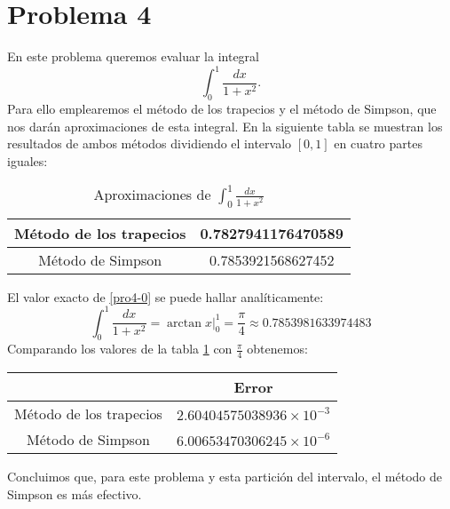 \documentclass[a4paper]{article}
\begin{document}
\section*{Problema 4}
En este problema queremos evaluar la integral 
\begin{equation}
    \int_0^1\frac{dx}{1+x^2}.
    \label{pro4-0}
\end{equation} Para ello emplearemos el método de los trapecios y el método de Simpson, que nos darán aproximaciones de esta integral. En la siguiente tabla se muestran los resultados de ambos métodos dividiendo el intervalo $[0,1]$ en cuatro partes iguales:
\begin{table}[ht]
    \centering
    \begin{tabular}{|c|c|}
        \hline
        Método de los trapecios & 0.7827941176470589 \\
        \hline
        Método de Simpson & 0.7853921568627452 \\
        \hline
    \end{tabular}
    \caption{Aproximaciones de $\int_0^1\frac{dx}{1+x^2}$}
    \label{pro4-1}
\end{table}\par
El valor exacto de \eqref{pro4-0} se puede hallar analíticamente: 
\begin{equation}
    \int_0^1\frac{dx}{1+x^2}=\arctan x\Big|_0^1=\frac{\pi}{4}\approx 0.7853981633974483
\end{equation}
Comparando los valores de la tabla \ref{pro4-1} con $\frac{\pi}{4}$ obtenemos: 
\begin{table}[ht]
    \centering
    \begin{tabular}{|c|c|}
        \hline
        & Error \\
        \hline
        Método de los trapecios & $2.60404575038936\times10^{-3}$ \\
        \hline
        Método de Simpson & $6.00653470306245\times10^{-6}$ \\
        \hline
    \end{tabular}
\end{table}\par
Concluimos que, para este problema y esta partición del intervalo, el método de Simpson es más efectivo.
\end{document}
